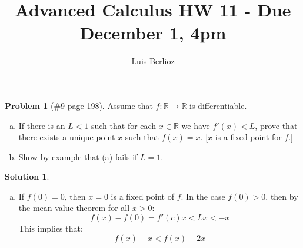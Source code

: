 \documentclass{article}
\theoremstyle{definition}
\newtheorem*{soln}{Solution}
\newtheorem*{prob}{Problem}
\theoremstyle{theorem}
\newcommand{\R}{\mathbb{R}}
\begin{document}
\title{Advanced Calculus HW 11 - Due December 1, 4pm}
\author{Luis Berlioz}
\maketitle



\begin{prob}[\#9 page 198]
    Assume that $f: \R \to \R$ is differentiable.
    \begin{enumerate}[(a)]
        \item If there is an $L<1$ such that for each $x\in \R$ we have $f'(x)<L$, prove that there exists a unique point $x$ such that $f(x) =x$. [$x$ is a fixed point for $f$.]        
        \item Show by example that (a) fails if $L=1$.
    \end{enumerate}
\end{prob}
\begin{soln}
    \begin{enumerate}[(a)]
        \item If $f(0)=0$, then $x=0$ is a fixed point of $f$. In the case $f(0)>0$, then by the mean value theorem for all $x>0$:
            $$f(x) - f(0) = f'(c)x < Lx < -x$$
            This implies that:
            $$f(x) -x < f(x) -2x$$
    \end{enumerate}
\end{soln}
\vspace{1in}
\end{document}
